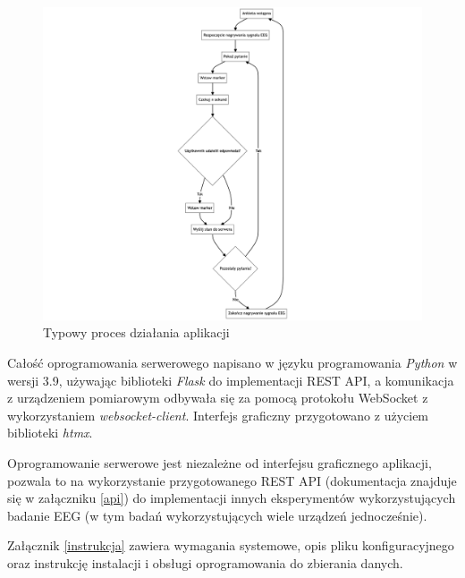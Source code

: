 \documentclass{./assets/wfis}
\begin{document}
\begin{figure}[h!]
    \centering
    \includegraphics[width=\columnwidth]{thesis/assets/app_flow.png}
    \caption{Typowy proces działania aplikacji}
    \label{fig:app-flow}
\end{figure}

Całość oprogramowania serwerowego napisano w języku programowania \textit{Python}\cite{python_developers_python_2024} w wersji 3.9, używając biblioteki \textit{Flask}\cite{flask_developers_flask_nodate} do implementacji REST API, a komunikacja z urządzeniem pomiarowym odbywała się za pomocą protokołu WebSocket z wykorzystaniem \textit{websocket-client}\cite{liris_websocket-client_nodate}. Interfejs graficzny przygotowano z użyciem biblioteki \textit{htmx}\cite{htmx_developers_htmx_nodate}.

Oprogramowanie serwerowe jest niezależne od interfejsu graficznego aplikacji, pozwala to na wykorzystanie przygotowanego REST API (dokumentacja znajduje się w załączniku \ref{api}) do implementacji innych eksperymentów wykorzystujących badanie EEG (w tym badań wykorzystujących wiele urządzeń jednocześnie).

Załącznik \ref{instrukcja} zawiera wymagania systemowe, opis pliku konfiguracyjnego oraz instrukcję instalacji i obsługi oprogramowania do zbierania danych.
\end{document}
